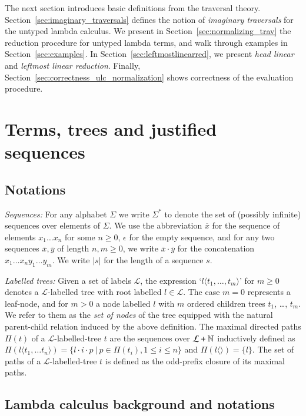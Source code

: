 \documentclass{elsarticle}
\theoremstyle{plain}
\theoremstyle{definition}
\begin{document}
The next section introduces basic definitions from the traversal theory. Section~\ref{sec:imaginary_traversals} defines the notion of \emph{imaginary traversals} for the untyped lambda calculus. We present in Section~\ref{sec:normalizing_trav} the reduction procedure for untyped lambda terms, and walk through examples in Section~\ref{sec:examples}. In Section~\ref{sec:leftmostlinearred}, we present \emph{head linear} and \emph{leftmost linear reduction}. Finally, Section~\ref{sec:correctness_ulc_normalization} shows correctness of the evaluation procedure.


\section{Terms, trees and justified sequences}
\label{sec:basic_def}
\subsection{Notations}
\emph{Sequences:} For any alphabet $\Sigma$ we write $\Sigma^*$ to denote the set of (possibly infinite) sequences over elements of $\Sigma$.
 We use the abbreviation $\overline{x}$ for the sequence of elements $x_1 \ldots x_n$ for some $n\geq0$, $\epsilon$ for the empty sequence, and for any two sequences $\overline{x}, \overline{y}$ of length $n,m\geq 0$, we write $\overline{x} \cdot \overline{y}$ for the concatenation $x_1 \ldots x_n y_1 \ldots y_m$. We write $|s|$ for the length of a sequence $s$.

 \emph{Labelled trees:} Given a set of labels $\mathcal{L}$, the expression `$l\langle t_1, \ldots, t_m \rangle$' for $m \geq 0$ denotes a $\mathcal{L}$-labelled tree with root labelled $l\in \mathcal{L}$. The case $m=0$ represents a leaf-node, and for $m>0$ a node labelled $l$ with $m$ ordered children trees $t_1$, \ldots, $t_m$.
 We refer to them as the \emph{set of nodes} of the tree equipped with
 the natural parent-child relation induced by the above definition.
 The maximal directed paths $\Pi(t)$ of a $\mathcal{L}$-labelled-tree $t$ are the sequences over $\mathcal{L} + \mathbb{N}$
 inductively defined as
 $\Pi(l \langle t_1, \ldots t_n \rangle) = \{ l \cdot i \cdot p \ |  \ p \in \Pi(t_i), 1\leq i \leq n \}$ and
 $\Pi(l\langle \rangle) = \{ l \}$.
 The set of paths of a $\mathcal{L}$-labelled-tree $t$ is defined as the odd-prefix closure of its maximal paths.

\subsection{Lambda calculus background and notations}
\label{sec:lambdacalculus_basics}
\end{document}
